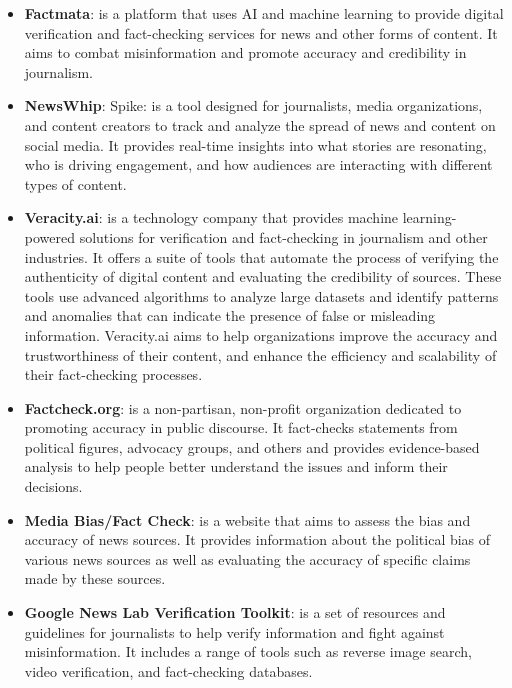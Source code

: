 \documentclass[target=mst,aauheader=]{thud}
\begin{document}
\begin{itemize} 

    \item \textbf{Factmata}\cite{factmata}: is a platform that uses AI and machine learning to provide digital verification and fact-checking services for news and other forms of content. It aims to combat misinformation and promote accuracy and credibility in journalism.
    \item \textbf{NewsWhip}\cite{NewsWhip}: Spike: is a tool designed for journalists, media organizations, and content creators to track and analyze the spread of news and content on social media. It provides real-time insights into what stories are resonating, who is driving engagement, and how audiences are interacting with different types of content.
    \item \textbf{Veracity.ai}\cite{veracity.ai/}: is a technology company that provides machine learning-powered solutions for verification and fact-checking in journalism and other industries. It offers a suite of tools that automate the process of verifying the authenticity of digital content and evaluating the credibility of sources. These tools use advanced algorithms to analyze large datasets and identify patterns and anomalies that can indicate the presence of false or misleading information. Veracity.ai aims to help organizations improve the accuracy and trustworthiness of their content, and enhance the efficiency and scalability of their fact-checking processes.
    \item \textbf{Factcheck.org}\cite{Factcheck}: is a non-partisan, non-profit organization dedicated to promoting accuracy in public discourse. It fact-checks statements from political figures, advocacy groups, and others and provides evidence-based analysis to help people better understand the issues and inform their decisions.
    \item \textbf{Media Bias/Fact Check}\cite{mediabiasfactcheck}: is a website that aims to assess the bias and accuracy of news sources. It provides information about the political bias of various news sources as well as evaluating the accuracy of specific claims made by these sources.
    \item \textbf{Google News Lab Verification Toolkit}\cite{googleVerificationToolkit}: is a set of resources and guidelines for journalists to help verify information and fight against misinformation. It includes a range of tools such as reverse image search, video verification, and fact-checking databases.

\end{itemize}
\end{document}
